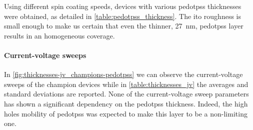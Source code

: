	Using different spin coating speeds, devices with various \gls{pedotpss} thicknesses were obtained, as detailed in \cref{table:pedotpss_thickness}.
	The \gls{ito} roughness is small enough to make us certain that even the thinner, \SI{27}{\nm}, \gls{pedotpss} layer results in an homogeneous coverage.

	\paragraph{Current-voltage sweeps}
	In \cref{fig:thicknesses-jv_champions-pedotpss} we can observe the current-voltage sweeps of the champion devices while in \cref{table:thicknesses_jv} the averages and standard deviations are reported.
	None of the current\hyp{}voltage sweep parameters has shown a significant dependency on the \gls{pedotpss}  thickness.
	Indeed, the high holes mobility of \gls{pedotpss} \cite{Rutledge2013} was expected to make this layer to be a non\hyp{}limiting one.






